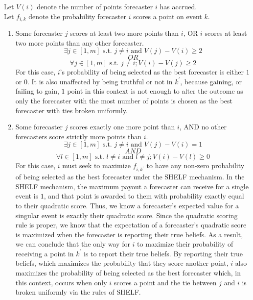 \documentclass[letterpaper,12pt]{article}
\newcommand{\1}{\mathbbm{1}}
\begin{document}
Let $V(i)$ denote the number of points forecaster $i$ has accrued.\\
Let $f_{i,k}$ denote the probability forecaster $i$ scores a point on event $k$.\\

\begin{enumerate}
    \item Some forecaster $j$ scores at least two more points than $i$, OR $i$ scores at least two more points than any other forecaster.\\
    $$\exists j \in [1,m] \text{ s.t. } j \ne i \text{ and } V(j) - V(i) \geq 2$$ 
    $$OR$$
    $$\forall j \in [1,m] \text{ s.t. } j \ne i; V(i) - V(j) \geq 2$$
    For this case, $i$'s probability of being selected as the best forecaster is either $1$ or $0$. It is also unaffected by being truthful or not in $k^\prime$, because gaining, or failing to gain, $1$ point in this context is not enough to alter the outcome as only the forecaster with the most number of points is chosen as the best forecaster with ties broken uniformly.
    
    \item Some forecaster $j$ scores exactly one more point than $i$, AND no other forecasters score strictly more points than $i$.\\
    $$\exists j \in [1,m] \text{ s.t. } j \neq i \text{ and } V(j) - V(i) = 1$$
    $$AND$$
    $$\forall l \in [1,m] \text{ s.t. } l \neq i \text{ and } l \neq j; V(i) - V(l) \geq 0$$
    For this case, $i$ must seek to maximize $f_{i,k^\prime}$ to have any non-zero probability of being selected as the best forecaster under the SHELF mechanism. 
    In the SHELF mechanism, the maximum payout a forecaster can receive for a single event is $1$, and that point is awarded to them with probability exactly equal to their quadratic score. Thus, we know a forecaster's expected value for a singular event is exactly their quadratic score. Since the quadratic scoring rule is proper, we know that the expectation of a forecaster's quadratic score is maximized when the forecaster is reporting their true beliefs. As a result, we can conclude that the only way for $i$ to maximize their probability of receiving a point in $k^\prime$ is to report their true beliefs. By reporting their true beliefs, which maximizes the probability that they score another point, $i$ also maximizes the probability of being selected as the best forecaster which, in this context, occurs when only $i$ scores a point and the tie between $j$ and $i$ is broken uniformly via the rules of SHELF.
    

\end{enumerate}
\end{document}
